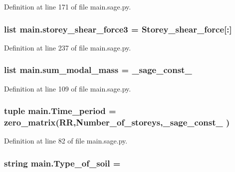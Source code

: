 Definition at line 171 of file main.\+sage.\+py.

\hypertarget{namespacemain_aa741e0bac28acc57bb99fbe2b14205c7}{}
\subsubsection[{storey\+\_\+shear\+\_\+force3}]{\setlength{\rightskip}{0pt plus 5cm}list main.\+storey\+\_\+shear\+\_\+force3 = {\bf Storey\+\_\+shear\+\_\+force}\mbox{[}\+:\mbox{]}}\label{namespacemain_aa741e0bac28acc57bb99fbe2b14205c7}


Definition at line 237 of file main.\+sage.\+py.

\hypertarget{namespacemain_a27fb93072b84fd448623807df350f132}{}
\subsubsection[{sum\+\_\+modal\+\_\+mass}]{\setlength{\rightskip}{0pt plus 5cm}list main.\+sum\+\_\+modal\+\_\+mass = \+\_\+sage\+\_\+const\+\_}\label{namespacemain_a27fb93072b84fd448623807df350f132}


Definition at line 109 of file main.\+sage.\+py.

\hypertarget{namespacemain_a6bf4b8266bcb3b4f390149620fea3d6c}{}
\subsubsection[{Time\+\_\+period}]{\setlength{\rightskip}{0pt plus 5cm}tuple main.\+Time\+\_\+period = zero\+\_\+matrix(R\+R,Number\+\_\+of\+\_\+storeys,\+\_\+sage\+\_\+const\+\_ )}\label{namespacemain_a6bf4b8266bcb3b4f390149620fea3d6c}


Definition at line 82 of file main.\+sage.\+py.

\hypertarget{namespacemain_a52e65712caa18dade1326ad4efeebfa1}{}
\subsubsection[{Type\+\_\+of\+\_\+soil}]{\setlength{\rightskip}{0pt plus 5cm}string main.\+Type\+\_\+of\+\_\+soil = \textquotesingle{}\textquotesingle{}}\label{namespacemain_a52e65712caa18dade1326ad4efeebfa1}


